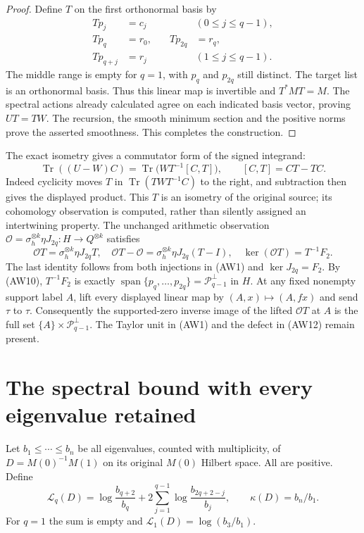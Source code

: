 \documentclass[11pt,a4paper]{article}
\DeclareMathOperator{\Tr}{Tr}
\newcommand{\cP}{\mathcal P}
\begin{document}
\begin{proof}
Define $T$ on the first orthonormal basis by
\[
 \begin{aligned}
 Tp_j&=c_j&& (0\le j\le q-1),\\
 Tp_q&=r_0,&\quad Tp_{2q}&=r_q,\\
 Tp_{q+j}&=r_j&& (1\le j\le q-1).
 \end{aligned}
 \tag{AW10}
\]
The middle range is empty for $q=1$, with $p_q$ and $p_{2q}$
still distinct. The target list is an orthonormal basis. Thus this
linear map is invertible and $T^*MT=M$. The spectral actions
already calculated agree on each indicated basis vector, proving
$UT=TW$. The recursion, the smooth minimum section and the positive
norms prove the asserted smoothness. This completes the construction.
\end{proof}

The exact isometry gives a commutator form of the signed integrand:
\[
 \Tr((U-W)C)=\Tr\bigl(WT^{-1}[C,T]\bigr),
 \qquad [C,T]=CT-TC.
 \tag{AW11}
\]
Indeed cyclicity moves $T$ in $\Tr(TWT^{-1}C)$ to the right,
and subtraction then gives the displayed product.
This $T$ is an isometry of the original source; its cohomology
observation is computed, rather than silently assigned an
intertwining property. The unchanged arithmetic observation
$\mathcal O=\sigma_h^{\otimes k}\eta J_{2q}:H\to Q^{\otimes k}$
satisfies
\[
 \mathcal O T=\sigma_h^{\otimes k}\eta J_{2q}T,
 \quad \mathcal O T-\mathcal O
       =\sigma_h^{\otimes k}\eta J_{2q}(T-I),
 \quad \ker(\mathcal O T)=T^{-1}F_2.
 \tag{AW12}
\]
The last identity follows from both injections in (AW1) and
$\ker J_{2q}=F_2$. By (AW10), $T^{-1}F_2$ is exactly
$\operatorname{span}\{p_q,\ldots,p_{2q}\}
=\cP_{q-1}^{\perp}$ in $H$.
At any fixed nonempty support label $A$, lift every displayed
linear map by $(A,x)\mapsto(A,fx)$ and send $\tau$ to $\tau$.
Consequently the supported-zero inverse image of the lifted
$\mathcal O T$ at $A$ is the full set
$\{A\}\times\cP_{q-1}^{\perp}$. The Taylor unit in (AW1)
and the defect in (AW12) remain present.

\section{The spectral bound with every eigenvalue retained}

Let $b_1\le\cdots\le b_n$ be all eigenvalues, counted with
multiplicity, of $D=M(0)^{-1}M(1)$ on its original $M(0)$
Hilbert space. All are positive. Define
\[
 \mathcal L_q(D)=\log\frac{b_{q+2}}{b_q}
       +2\sum_{j=1}^{q-1}\log\frac{b_{2q+2-j}}{b_j},
 \qquad \kappa(D)=b_n/b_1.
 \tag{AW13}
\]
For $q=1$ the sum is empty and $\mathcal L_1(D)=\log(b_3/b_1)$.
\end{document}
